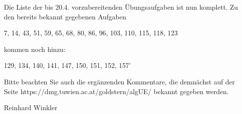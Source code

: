 Die Liste der bis 20.4. vorzubereitenden Übungsaufgaben ist nun komplett. Zu den bereits bekannt gegebenen Aufgaben

7, 14, 43, 51, 59, 65, 68, 80, 86, 96, 103, 110, 115, 118, 123

kommen noch hinzu:

129, 134, 140, 141, 147, 150, 151, 152, 157'

Bitte beachten Sie auch die ergänzenden Kommentare, die demnächst auf der Seite
https://dmg.tuwien.ac.at/goldstern/algUE/
bekannt gegeben werden.

Reinhard Winkler
